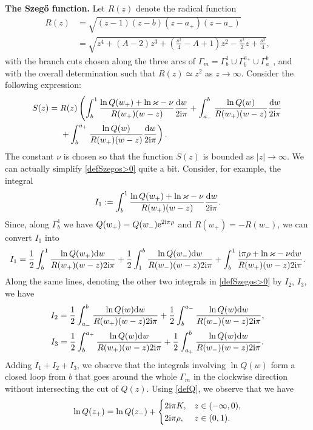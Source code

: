 \documentclass[pdftex]{sigma}
\numberwithin{equation}{section}
\theoremstyle{definition}
\def\le{\left}
\def\ri{\right}
\def \d{{\mathrm d}}
\begin{document}
{\bf The Szeg\H{o} function.}
Let $R(z)$ denote the radical function
\begin{align}
R(z) &=\sqrt{(z-1)(z-b)(z-a_+)(z-a_-)} \nonumber\\
&= \sqrt{
z^4 + (A-2)z^3 + \le(\frac {s^2}4 - A+1\ri) z^2 - \frac {s^2}2 z + \frac {s^2}4},\label{defR}
\end{align}
with the branch cuts chosen along the three arcs of $\Gamma_m = \Gamma_b^1\cup \Gamma_{b}^{a_+} \cup \Gamma_{a_-}^b$, and with the overall determination such that $R(z) \simeq z^2$ as $z\to\infty$.
Consider the following expression:
\begin{align}
S(z) ={}& R(z) \left(
\int_b^1\frac{\ln Q(w_+) + \ln \varkappa-\nu}{R(w_+)(w-z)} \frac{\d w}{2{\rm i}\pi}
+
\int_{a_-}^b\frac{\ln Q(w)}{R(w_+)(w-z)} \frac{\d w}{2{\rm i}\pi}\right.\nonumber\\
&\left.
+
\int_b^{a_+} \frac{\ln Q(w) }{R(w_+)(w-z)} \frac{\d w}{2{\rm i}\pi}
 \right).\label{defSzegos>0}
\end{align}
The constant $\nu$ is chosen so that the function $S(z)$ is bounded as $|z|\to\infty$.
We can actually simplify \eqref{defSzegos>0} quite a bit. Consider, for example, the integral
\[
I_1:= \int_b^1\frac{\ln Q(w_+) + \ln \varkappa-\nu}{R(w_+)(w-z)} \frac{\d w}{2{\rm i}\pi}.
\]
Since, along $\Gamma_b^1$ we have $Q(w_+) = Q(w_-) {\rm e}^{2{\rm i}\pi { {\rho}}}$ and $R(w_+)=-R(w_-)$, we can convert $I_1$ into
\[
I_1 = \frac 1 2 \int_{b}^1 \frac {\ln Q(w_+) \d w}{R(w_+)(w-z)2{\rm i}\pi} + \frac 1 2 \int_{1}^b \frac {\ln Q(w_-) \d w}{R(w_-)(w-z)2{\rm i}\pi} + \int_{b}^1 \frac{{\rm i}\pi { {\rho}} + \ln \varkappa -\nu \d w}{R(w_+)(w-z)2{\rm i}\pi}.
\]
Along the same lines, denoting the other two integrals in \eqref{defSzegos>0} by $I_2$, $I_3$, we have
\begin{gather*}
I_2 = \frac 1 2\int_{a_-}^b \frac {\ln Q(w) \d w}{R(w_+)(w-z)2{\rm i}\pi} + \frac 1 2\int^{a_-}_b \frac {\ln Q(w) \d w}{R(w_-)(w-z)2{\rm i}\pi},
\\
I_3 = \frac 1 2\int^{a_+}_b \frac {\ln Q(w) \d w}{R(w_+)(w-z)2{\rm i}\pi} + \frac 1 2\int_{a_+}^b \frac {\ln Q(w) \d w}{R(w_-)(w-z)2{\rm i}\pi}.
\end{gather*}
Adding $I_1+I_2+I_3$, we observe that the integrals involving $\ln Q(w)$ form a closed loop from $b$ that goes around the whole $\Gamma_m$ in the clockwise direction without intersecting the cut of $Q(z)$.
Using \eqref{defQ}, we observe that we have
\[
\ln Q(z_+) = \ln Q(z_-) + \begin{cases}
 2{\rm i}\pi{K},& z\in (-\infty,0),\\
2{\rm i}\pi{\rho}, & z\in (0,1).
\end{cases}
\]
\end{document}
